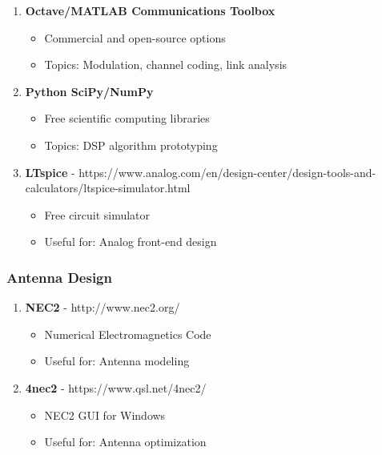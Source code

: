 \begin{enumerate}
\def\labelenumi{\arabic{enumi}.}
\setcounter{enumi}{51}
\tightlist
\item
  \textbf{Octave/MATLAB Communications Toolbox}

  \begin{itemize}
  \tightlist
  \item
    Commercial and open-source options
  \item
    Topics: Modulation, channel coding, link analysis
  \end{itemize}
\item
  \textbf{Python SciPy/NumPy}

  \begin{itemize}
  \tightlist
  \item
    Free scientific computing libraries
  \item
    Topics: DSP algorithm prototyping
  \end{itemize}
\item
  \textbf{LTspice} -
  https://www.analog.com/en/design-center/design-tools-and-calculators/ltspice-simulator.html

  \begin{itemize}
  \tightlist
  \item
    Free circuit simulator
  \item
    Useful for: Analog front-end design
  \end{itemize}
\end{enumerate}

\subsubsection{Antenna Design}\label{antenna-design}

\begin{enumerate}
\def\labelenumi{\arabic{enumi}.}
\setcounter{enumi}{54}
\tightlist
\item
  \textbf{NEC2} - http://www.nec2.org/

  \begin{itemize}
  \tightlist
  \item
    Numerical Electromagnetics Code
  \item
    Useful for: Antenna modeling
  \end{itemize}
\item
  \textbf{4nec2} - https://www.qsl.net/4nec2/

  \begin{itemize}
  \tightlist
  \item
    NEC2 GUI for Windows
  \item
    Useful for: Antenna optimization
  \end{itemize}
\end{enumerate}

